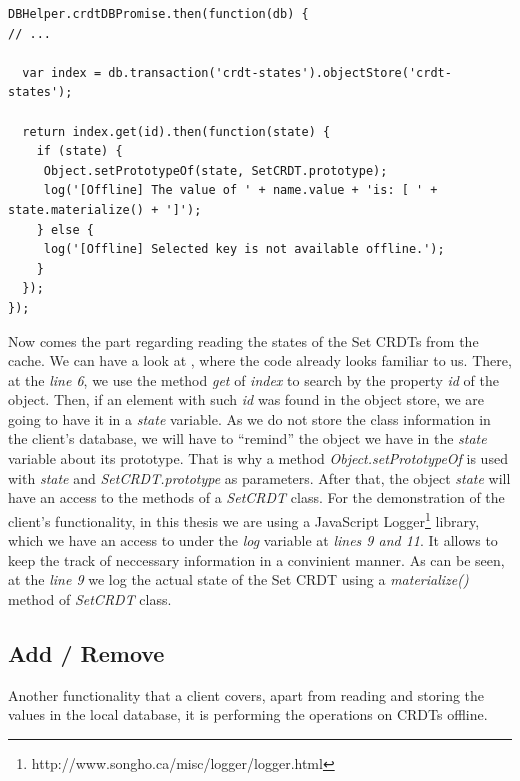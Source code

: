\begin{lstlisting}[caption={Reading CRDT states from client's cache.}, label={lst:dev10}]
DBHelper.crdtDBPromise.then(function(db) {
// ...

  var index = db.transaction('crdt-states').objectStore('crdt-states');

  return index.get(id).then(function(state) {
    if (state) {
     Object.setPrototypeOf(state, SetCRDT.prototype);
     log('[Offline] The value of ' + name.value + 'is: [ ' + state.materialize() + ']');
    } else {
     log('[Offline] Selected key is not available offline.');
    }
  });
});
\end{lstlisting}

Now comes the part regarding reading the states of the Set CRDTs from the cache. We can have a look at , where the code already looks familiar to us. There, at the \textit{line 6}, we use the method \textit{get} of \textit{index} to search by the property \textit{id} of the object. Then, if an element with such \textit{id} was found in the object store, we are going to have it in a \textit{state} variable. As we do not store the class information in the client's database, we will have to ``remind'' the object we have in the \textit{state} variable about its prototype. That is why a method \textit{Object.setPrototypeOf} is used with \textit{state} and \textit{SetCRDT.prototype} as parameters. After that, the object \textit{state} will have an access to the methods of a \textit{SetCRDT} class. For the demonstration of the client's functionality, in this thesis we are using a JavaScript Logger\footnote{http://www.songho.ca/misc/logger/logger.html} library, which we have an access to under the \textit{log} variable at \textit{lines 9 and 11}. It allows to keep the track of neccessary information in a convinient manner. As can be seen, at the \textit{line 9} we log the actual state of the Set CRDT using a \textit{materialize()} method of \textit{SetCRDT} class.

\subsection*{Add / Remove}

Another functionality that a client covers, apart from reading and storing the values in the local database, it is performing the operations on CRDTs offline.

